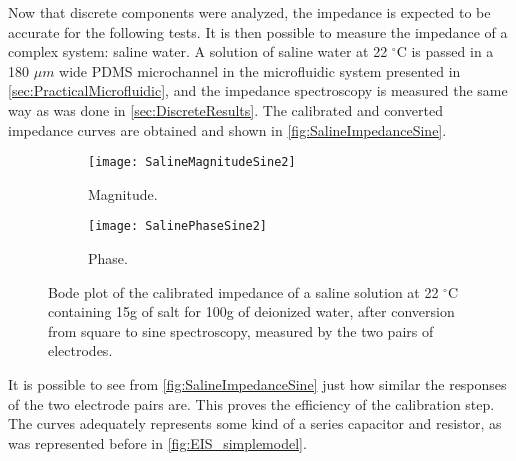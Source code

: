 Now that discrete components were analyzed, the impedance is expected to be accurate for the following tests. It is then possible to measure the impedance of a complex system: saline water. A solution of saline water at 22 $^{\circ}$C is passed in a 180 $\mu m$ wide PDMS microchannel in the microfluidic system presented in \autoref{sec:PracticalMicrofluidic}, and the impedance spectroscopy is measured the same way as was done in \autoref{sec:DiscreteResults}. The calibrated and converted impedance curves are obtained and shown in \autoref{fig:SalineImpedanceSine}. \par
\begin{figure}[h]
\centering
\begin{subfigure}{0.99\textwidth}
\centering
    \texttt{[image: SalineMagnitudeSine2]}
    \caption{Magnitude.}
    \label{fig:SalineSineMagnitude2}
\end{subfigure}
\begin{subfigure}{0.99\textwidth}
\centering
    \texttt{[image: SalinePhaseSine2]}
    \caption{Phase.}
    \label{fig:SalinePhaseSine2}
\end{subfigure}
\caption{Bode plot of the calibrated impedance of a saline solution at 22 $^{\circ}$C containing 15g of salt for 100g of deionized water, after conversion from square to sine spectroscopy, measured by the two pairs of electrodes.}
\label{fig:SalineImpedanceSine}
\end{figure}

It is possible to see from \autoref{fig:SalineImpedanceSine} just how similar the responses of the two electrode pairs are. This proves the efficiency of the calibration step. The curves adequately represents some kind of a series capacitor and resistor, as was represented before in \autoref{fig:EIS_simplemodel}. 